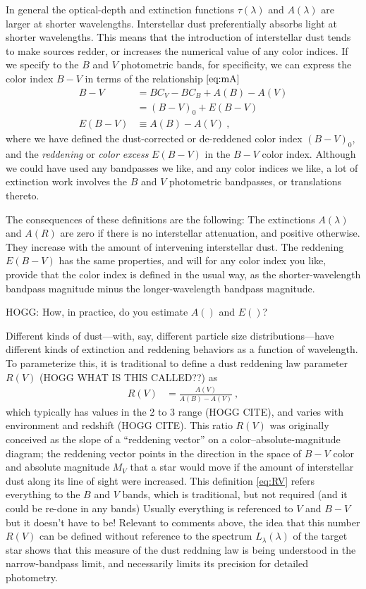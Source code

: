 \documentclass[10pt]{article}
\begin{document}
In general the optical-depth and extinction functions $\tau(\lambda)$ and $A(\lambda)$ are larger at shorter wavelengths.
Interstellar dust preferentially absorbs light at shorter wavelengths.
This means that the introduction of interstellar dust tends to make sources redder, or increases the numerical value of any color indices.
If we specify to the $B$ and $V$ photometric bands, for specificity, we can express the color index $B-V$ in terms of the relationship $\eqref{eq:mA}$
\begin{align}
    B - V &= BC_V - BC_B + A(B) - A(V)\\
          &= (B - V)_0 + E(B - V)\\
    E(B - V) &\equiv A(B) - A(V) ~,
\end{align}
where we have defined the dust-corrected or de-reddened color index $(B-V)_0$,
and the \emph{reddening} or \emph{color excess} $E(B-V)$ in the $B-V$ color index.
Although we could have used any bandpasses we like, and any color indices we like,
a lot of extinction work involves the $B$ and $V$ photometric bandpasses, or translations thereto.

The consequences of these definitions are the following:
The extinctions $A(\lambda)$ and $A(R)$ are zero if there is no interstellar attenuation, and positive otherwise.
They increase with the amount of intervening interstellar dust.
The reddening $E(B-V)$ has the same properties, and will for any color index you like, provide that the color index is defined in the usual way, as the shorter-wavelength bandpass magnitude minus the longer-wavelength bandpass magnitude.

HOGG: How, in practice, do you estimate $A()$ and $E()$?

Different kinds of dust---with, say, different particle size distributions---have different kinds of extinction and reddening behaviors as a function of wavelength.
To parameterize this, it is traditional to define a dust reddening law parameter $R(V)$ (HOGG WHAT IS THIS CALLED??) as
\begin{align}
    R(V) &= \frac{A(V)}{A(B) - A(V)}\label{eq:RV} ~,
\end{align}
which typically has values in the 2 to 3 range (HOGG CITE), and varies with environment and redshift (HOGG CITE).
This ratio $R(V)$ was originally conceived as the slope of a ``reddening vector'' on a color--absolute-magnitude diagram; the reddening vector points in the direction in the space of $B-V$ color and absolute magnitude $M_V$ that a star would move if the amount of interstellar dust along its line of sight were increased.
This definition \eqref{eq:RV} refers everything to the $B$ and $V$ bands, which is traditional, but not required (and it could be re-done in any bands)
Usually everything is referenced to $V$ and $B-V$ but it doesn't have to be!
Relevant to comments above, the idea that this number $R(V)$ can be defined without reference to the spectrum $L_\lambda(\lambda)$ of the target star shows that this measure of the dust reddning law is being understood in the narrow-bandpass limit, and necessarily limits its precision for detailed photometry.
\end{document}
